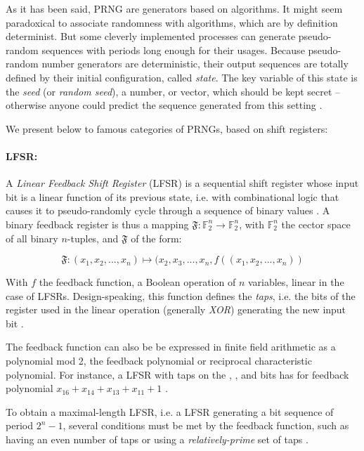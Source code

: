 \documentclass{llncs}
\begin{document}
As it has been said, PRNG are generators based on algorithms. It might seem paradoxical to associate randomness with algorithms, which are by definition determinist. But some cleverly implemented processes can generate pseudo-random sequences with periods long enough for their usages. Because pseudo-random number generators are deterministic, their output sequences are totally defined by their initial configuration, called \emph{state}. The key variable of this state is the \emph{seed} (or \emph{random seed}), a number, or vector, which should be kept secret – otherwise anyone could predict the sequence generated from this setting \cite{w-rng,down}.

We present below to famous categories of PRNGs, based on shift registers:


\paragraph{LFSR:}


A \emph{Linear Feedback Shift Register} (LFSR) is a sequential shift register whose input bit is a linear function of its previous state, i.e. with combinational logic that causes it to pseudo-randomly cycle through a sequence of binary values \cite{ray:and,joux}. A binary feedback register is thus a mapping $\mathfrak{F}:\mathbb{F}_2^n \to \mathbb{F}_2^n$, with $\mathbb{F}_2^n$ the cector space of all binary $n$-tuples, and $\mathfrak{F}$ of the form:

$$\mathfrak{F}:(x_1, x_2, ..., x_n)\mapsto (x_2, x_3, ..., x_n, f((x_1, x_2, ..., x_n))$$

With $f$ the feedback function, a Boolean operation of $n$ variables, linear in the case of LFSRs. Design-speaking, this function defines the \emph{taps}, i.e. the bits of the register used in the linear operation (generally \textit{XOR}) generating the new input bit \cite{szmi,joux}.

The feedback function can also be be expressed in finite field arithmetic as a polynomial mod 2, the feedback polynomial or reciprocal characteristic polynomial. For instance, a LFSR with taps on the , ,  and  bits has for feedback polynomial $x_{16} + x_{14} + x_{13} + x_{11} + 1$ \cite{w-lfsr}\cite{joux}.

To obtain a maximal-length LFSR, i.e. a LFSR generating a bit sequence of period $2^n-1$, several conditions must be met by the feedback function, such as having an even number of taps or using a \textit{relatively-prime} set of taps \cite{w-lfsr}\cite{joux}.
\end{document}

